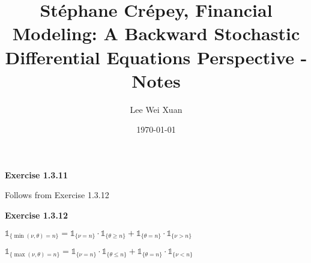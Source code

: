 \documentclass[12pt]{article}
\title{Stéphane Crépey, Financial Modeling: A Backward Stochastic 
Differential Equations Perspective - Notes}
\author{Lee Wei Xuan}
\date{\today}
\begin{document}
\maketitle

\textbf{Exercise 1.3.11}

Follows from Exercise 1.3.12



\textbf{Exercise 1.3.12}

$\mathds{1}_{\{\min(\nu, \theta) = n\}} = \mathds{1}_{\{\nu = n\}}\cdot \mathds{1}_{\{\theta \geq n\}} + \mathds{1}_{\{\theta = n\}}\cdot \mathds{1}_{\{\nu > n\}}$

$\mathds{1}_{\{\max(\nu, \theta) = n\}} = \mathds{1}_{\{\nu = n\}}\cdot \mathds{1}_{\{\theta \leq n\}} + \mathds{1}_{\{\theta = n\}}\cdot \mathds{1}_{\{\nu < n\}}$
\end{document}
